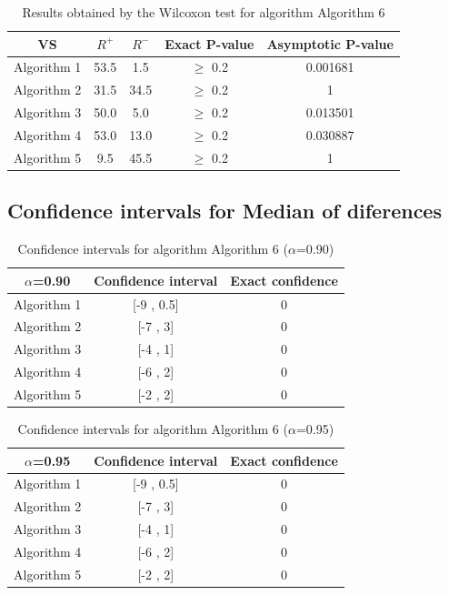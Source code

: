 \documentclass[a4paper,10pt]{article}
\begin{document}
\begin{table}[!htp]
\centering\small
\begin{tabular}{
|c|c|c|c|c|}
\hline
 VS & $R^{+}$ & $R^{-}$ & Exact P-value & Asymptotic P-value \\ \hline 
Algorithm 1 & 53.5 & 1.5 & $\geq$ 0.2 & 0.001681\\ \hline 
Algorithm 2 & 31.5 & 34.5 & $\geq$ 0.2 & 1\\ \hline 
Algorithm 3 & 50.0 & 5.0 & $\geq$ 0.2 & 0.013501\\ \hline 
Algorithm 4 & 53.0 & 13.0 & $\geq$ 0.2 & 0.030887\\ \hline 
Algorithm 5 & 9.5 & 45.5 & $\geq$ 0.2 & 1\\ \hline 

\end{tabular}
\caption{Results obtained by the Wilcoxon test for algorithm Algorithm 6}
\end{table}

\subsection{Confidence intervals for Median of diferences}

\begin{table}[!htp]
\centering\small
\begin{tabular}{
|c|c|c|}
\hline
 $\alpha$=0.90 & Confidence interval & Exact confidence \\ \hline 
Algorithm 1 & [-9 , 0.5] & 0\\ \hline 
Algorithm 2 & [-7 , 3] & 0\\ \hline 
Algorithm 3 & [-4 , 1] & 0\\ \hline 
Algorithm 4 & [-6 , 2] & 0\\ \hline 
Algorithm 5 & [-2 , 2] & 0\\ \hline 

\end{tabular}
\caption{Confidence intervals for algorithm Algorithm 6 ($\alpha$=0.90)}
\end{table}
\begin{table}[!htp]
\centering\small
\begin{tabular}{
|c|c|c|}
\hline
 $\alpha$=0.95 & Confidence interval & Exact confidence \\ \hline 
Algorithm 1 & [-9 , 0.5] & 0\\ \hline 
Algorithm 2 & [-7 , 3] & 0\\ \hline 
Algorithm 3 & [-4 , 1] & 0\\ \hline 
Algorithm 4 & [-6 , 2] & 0\\ \hline 
Algorithm 5 & [-2 , 2] & 0\\ \hline 

\end{tabular}
\caption{Confidence intervals for algorithm Algorithm 6 ($\alpha$=0.95)}
\end{table}

 \clearpage 
\end{document}
